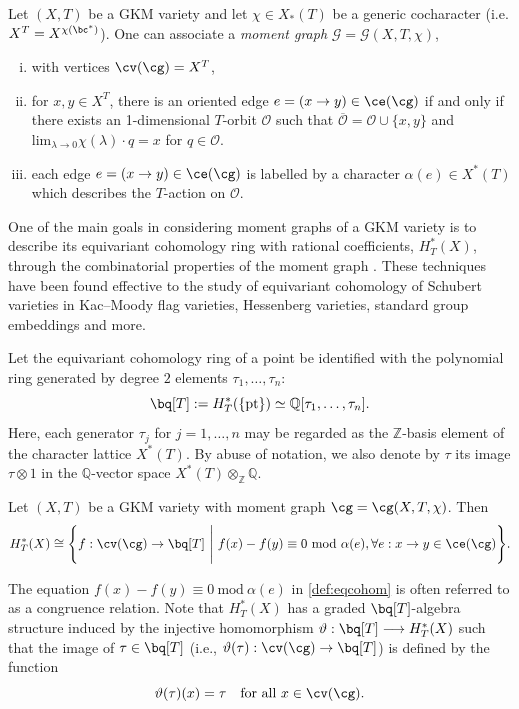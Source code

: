 \documentclass[10pt, a4paper, reqno]{amsart}
\begin{document}
\begin{defe}
Let $(X,T)$ be a GKM variety and let $\chi\in X_*(T)$ be a generic cocharacter (i.e. $X^T=X^{\chi(\bc^*)}$). One can associate a \emph{moment graph} $\mathcal{G}=\mathcal{G}(X,T,\chi)$,
\begin{enumerate}[(i)]
	\item  with vertices $\cv(\cg)=X^T$,
	\item for $x,y\in X^T$, there is an oriented edge $e=(x\to y)\in\ce(\cg)$ if and only if there exists an 1-dimensional $T$-orbit $\mathcal{O}$ such that $\overline{\mathcal{O}}=\mathcal{O}\cup \{x,y\}$ and $\mbox{lim}_{ \lambda\to 0}\chi(\lambda)\cdot q=x$ for $q\in \mathcal{O}$.
	\item each edge $e=(x\to y)\in\ce(\cg)$ is labelled by a character $\alpha(e)\in X^*(T)$ which describes the $T$-action on $\mathcal{O}$.
\end{enumerate}  
\end{defe}
 

One of the main goals in considering moment graphs of a GKM variety is to describe its equivariant cohomology ring with rational coefficients, 
\( H_T^*(X) \), through the combinatorial properties of the moment graph \cite[Theorem 1.2.2]{gkm}.  These techniques have been found effective to the study of equivariant cohomology of Schubert varieties in Kac--Moody flag varieties, Hessenberg varieties, standard group embeddings and more. 

Let the equivariant cohomology ring of a point be identified with the polynomial ring generated by degree $2$ elements $\tau_1, \ldots, \tau_n$:
\begin{equation}
	\bq[T]:=	H_T^*(\{\mathrm{pt}\}) \simeq \mathbb{Q}[\tau_1, \ldots, \tau_n].
\end{equation}
Here, each generator $\tau_j$ for $j = 1, \ldots, n$ may be regarded as the $\mathbb{Z}$-basis element  of the character lattice $X^*(T)$.  
By abuse of notation, we also denote by $\tau$ its image $\tau \otimes 1$ in the $\mathbb{Q}$-vector space $X^*(T) \otimes_{\mathbb{Z}} \mathbb{Q}$.

\begin{guess}
	Let $(X,T)$ be a GKM variety with moment graph $\cg=\cg(X,T,\chi)$. Then 
\begin{equation}\label{def:eqcohom}
	 H_T^*(X)\cong\Bigg\{f:\cv(\cg)\to \bq[T]~\Bigg|~ f(x)-f(y)\equiv 0~ \mbox{mod} ~\alpha(e), \forall e:x\to y\in\ce(\cg)\Bigg\}.             
\end{equation}
\end{guess}
The equation $f(x)-f(y)\equiv 0~ \mbox{mod} ~\alpha(e)$ in \eqref{def:eqcohom} is often referred to as a congruence relation. Note that $H^*_T(X)$ has a graded $\bq[T]$-algebra structure induced by 
the injective homomorphism $	\vartheta: \bq[T] \longrightarrow H^*_T(X)$ such that the image of $\tau\in \bq[T] $ (i.e., $\vartheta(\tau): \cv(\cg) \to \bq[T]$) is defined by the function
\begin{equation}\label{def:qt_elements_as_map}
\vartheta(\tau)(x) = \tau \quad \text{for all } x\in \cv(\cg).
\end{equation}
\end{document}
